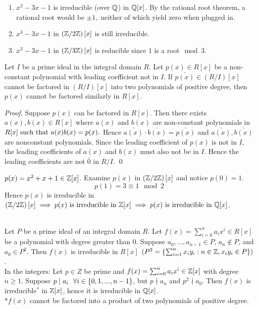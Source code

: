 \begin{example}
    \begin{enumerate}
        \item $x^3-3x-1$ is irreducible (over $\mathbb{Q}$) in $\mathbb{Q}[x]$. By the rational root theorem, a rational root would be $\pm 1,$ neither of which yield zero when plugged in.
        \item $x^3-3x-1$ in $\left(\mathbb{Z}/2\mathbb{Z}\right)[x]$ is still irreducible.
        \item $x^3-3x-1$ in $\left(\mathbb{Z}/3\mathbb{Z}\right)[x]$ is reducible since $1$ is a root$\mod 3$.
    \end{enumerate}
\end{example}

\begin{proposition}
    Let $I$ be a prime ideal in the integral domain $R$. Let $p(x) \in R[x]$ be a non-constant polynomial with leading coefficient not in $I.$ If $\bar{p(x)} \in \left(R/I\right)[x]$ cannot be factored in $\left(R/I\right)[x]$ into two polynomials of positive degree, then $p(x)$ cannot be factored similarly in $R[x]$.
\end{proposition}

\begin{proof}
    Suppose $p(x)$ can be factored in $R[x]$. Then there exists $a(x),b(x) \in R[x]$ where $a(x)$ and $b(x)$ are non-constant polynomials in $R[x] \text{ such that } a(x)b(x) = p(x).$ Hence $\bar{a(x)}\cdot \bar{b(x)} = \bar{p(x)}$ and $\bar{a(x)}, \bar{b(x)}$ are nonconstant polynomials. Since the leading coefficient of $p(x)$ is not in $I$, the leading coefficients of $a(x)$ and $b(x)$ must also not be in $I$. Hence the leading coefficients are not $\bar{0}$ in $R/I$.
    \qed
\end{proof}

\begin{example}
    $p(x) = x^2+x+1 \in \mathbb{Z}[x]$. Examine $p(x)$ in $\left(\mathbb{Z}/2\mathbb{Z}\right)[x]$ and notice $p(0) = 1$.
    $$p(1) = 3 \equiv 1 \mod 2$$
    Hence $p(x)$ is irreducible in $\left(\mathbb{Z}/2\mathbb{Z}\right)[x] \implies p(x) \text{ is irreducible in $\mathbb{Z}[x]$} \implies p(x) \text{ is irreducible in $\mathbb{Q}[x]$}$.
\end{example}

\begin{theorem} \leavevmode \\
    Let $P$ be a prime ideal of an integral domain $R$. Let $f(x) = \sum_{i=0}^{n}a_ix^i \in R[x]$ be a polynomial with degree greater than $0$. Suppose $a_0,...,a_{n-1} \in P$, $a_n \not \in P$, and $a_0 \in P^2$. Then $f(x)$ is irreducible in $R[x]$ $(P^2 = \left\{\sum_{i=1}^{n}x_iy_i : n \in \mathbb{Z}, x_iy_i \in P\right\})$. \\
    In the integers: Let $p \in Z$ be prime and $f(x) = \sum_{i=0}^{n}a_ix^i \in \mathbb{Z}[x]$ with degree $n \geq 1$. Suppose $p \mid a_i ~~\forall i \in \left\{0,1,...,n-1\right\}$, but $p \nmid a_n$ and $p^2 \nmid a_0$. Then $f(x)$ is irreducible$^*$ in $\mathbb{Z}[x]$, hence it is irreducible in $\mathbb{Q}[x]$. \\
    $* f(x)$ cannot be factored into a product of two polynomials of positive degree.
\end{theorem}

